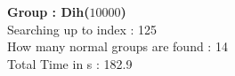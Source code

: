 \textbf{Group : Dih($10000$)}\\
Searching up to index : 125\\
How many normal groups are found : 14\\
Total Time in s : 182.9\\
